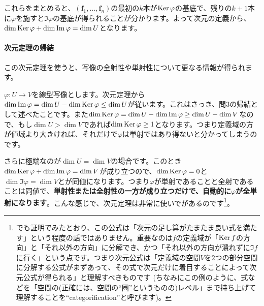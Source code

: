 これらをまとめると、$(\bm{f}_1, \ldots, \bm{f}_n)$の最初の$k$本が$\operatorname{Ker} \varphi$の基底で、残りの$k + 1$本に$\varphi$を施すと$\Im \varphi$の基底が得られることが分かります。よって次元の定義から、$\dim \operatorname{Ker} \varphi + \dim \mathrm{Im}\, \varphi = \dim U$となります。

\paragraph{次元定理の帰結} この次元定理を使うと、写像の全射性や単射性について更なる情報が得られます。

$\varphi\colon U\rightarrow V$を線型写像とします。次元定理から$\dim \mathrm{Im}\, \varphi = \dim U - \dim \operatorname{Ker} \varphi \leq \dim U$が従います。これはさっき、問$3$の帰結として述べたことです。また$\dim \operatorname{Ker} \varphi = \dim U - \dim \mathrm{Im}\, \varphi \geq \dim U - \dim V$なので、もし$\dim U > \dim V$であれば$\dim \operatorname{Ker} \varphi \geq 1$となります。つまり定義域の方が値域より大きければ、それだけで$\varphi$は単射ではあり得ないと分かってしまうのです。

さらに極端なのが$\dim U = \dim V$の場合です。このとき$\dim \operatorname{Ker} \varphi + \dim \mathrm{Im}\, \varphi = \dim V$が成り立つので、$\dim \operatorname{Ker} \varphi = 0$と$\dim \Im \varphi = \dim V$とが同値になります。つまり$\varphi$が単射であることと全射であることは同値で、\textbf{単射性または全射性の一方が成り立つだけで、自動的に$\varphi$が全単射になります}。こんな感じで、次元定理は非常に使いでがあるのです\footnote{でも証明でみたとおり、この公式は「次元の足し算がたまたま良い式を満たす」という程度の話ではありません。重要なのは$f$の定義域が「$\operatorname{Ker} f$の方向」と「それ以外の方向」に分解でき、かつ「それ以外の方向が潰れずに$\Im f$に行く」という点です。つまり次元公式は「定義域の空間$V$を$2$つの部分空間に分解する公式がまずあって、その式で次元だけに着目することによって次元公式が得られる」と理解すべきものです (ちなみにこの例のように、式などを「空間の(正確には、空間の``圏''というものの)レベル」まで持ち上げて理解することを``categorification''と呼びます)。}。

